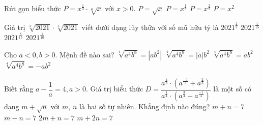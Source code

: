 \begin{ex}%
	Rút gọn  biểu thức $P=x^{\frac{1}{3}}\cdot \sqrt [6]{x}$ với $ x>0$.
	 \choice
		{\True $P=\sqrt  {x}$}
		 {$P=x^{\frac{1}{8}}$}
		{$P=x^{\frac{2}{9}}$} 
		 {$P=x^2$}
\end{ex}

\begin{ex}%
	Giá trị $\sqrt [3]{2021}\cdot \sqrt [5]{2021}$ viết dưới dạng lũy thữa với số  mũ hữu tỷ là
	 \choice
		{$2021^{\frac{2}{5}}$} 
		 {$2021^{\frac{1}{15}}$}
		{\True  $2021^{\frac{8}{15}}$}
		{$2021^{\frac{1}{10}}$} 
\end{ex}

\begin{ex}%
	Cho  $ a<0,b>0$. Mệnh đề nào sai?
	\choice 
		{$\sqrt [4]{a^4b^8}=| ab^2 |$} 
		 {$\sqrt [4]{a^4b^8}=| a |b^2$}
		{\True $\sqrt  [4]{a^4b^8}=ab^2$}
		{$\sqrt [4]{a^4b^8}=-ab^2$} 
\end{ex}

\begin{ex}%
	Biết rằng $ a-\dfrac{1}{a}=4,a>0$. Giá trị biểu thức $D=\dfrac{a^{\frac{4}{3}}\cdot \left(a^{\frac{-1}{3}}+a^{\frac{2}{3}}\right)}{a^{\frac{1}{4}}\cdot \left(a^{\frac{3}{4}}+a^{\frac{-1}{4}}\right)}$ là một số có dạng  $ m+\sqrt {n}$ với $ m$, $ n$ là hai số tự nhiên. Khẳng định nào đúng?
	 \choice
		{\True  $ m+n=7$}
		{$  m-n=7$}
		{$2m+n=7$} 
		 {$ m+2n=7$}
\end{ex}

